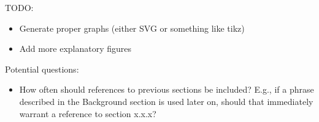 \color{purple}
TODO:
\begin{itemize}
  \item Generate proper graphs (either SVG or something like tikz)
  \item Add more explanatory figures
\end{itemize}

\color{purple}
Potential questions:
\begin{itemize}
  \item How often should references to previous sections be included? E.g., if a
    phrase described in the Background section is used later on, should that
    immediately warrant a reference to section x.x.x?
\end{itemize}

